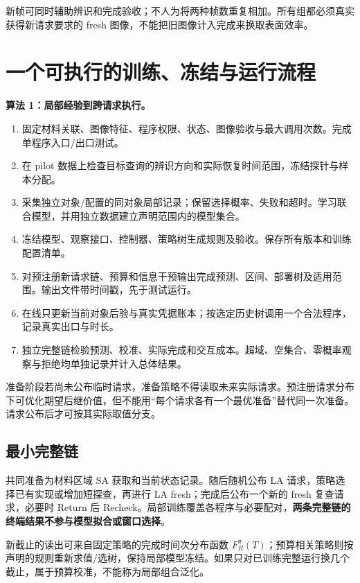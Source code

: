 \documentclass[11pt,a4paper,fontset=fandol]{ctexart}
\theoremstyle{definition}\newtheorem{definition}[theorem]{定义}
\theoremstyle{remark}\newtheorem{remark}[theorem]{说明}
\numberwithin{equation}{section}
\begin{document}
新帧可同时辅助辨识和完成验收；不人为将两种帧数重复相加。所有组都必须真实获得新请求要求的 fresh 图像，不能把旧图像计入完成来换取表面效率。

\clearpage
\section{一个可执行的训练、冻结与运行流程}
\label{sec:workflow}
\begin{corebox}
\textbf{算法 1：局部经验到跨请求执行。}
\begin{enumerate}
\item 固定材料关联、图像特征、程序权限、状态、图像验收与最大调用次数。完成单程序入口/出口测试。
\item 在 pilot 数据上检查目标查询的辨识方向和实际恢复时间范围，冻结探针与样本分配。
\item 采集独立对象/配置的同对象局部记录；保留选择概率、失败和超时。学习联合模型，并用独立数据建立声明范围内的模型集合。
\item 冻结模型、观察接口、控制器、策略树生成规则及验收。保存所有版本和训练配置清单。
\item 对预注册新请求链、预算和信息干预输出完成预测、区间、部署树及适用范围。输出文件带时间戳，先于测试运行。
\item 在线只更新当前对象后验与真实凭据账本；按选定历史树调用一个合法程序，记录真实出口与时长。
\item 独立完整链检验预测、校准、实际完成和交互成本。超域、空集合、零概率观察与拒绝均单独记录并计入总体结果。
\end{enumerate}
\end{corebox}

准备阶段若尚未公布临时请求，准备策略不得读取未来实际请求。预注册请求分布下可优化期望后继价值，但不能用“每个请求各有一个最优准备”替代同一次准备。请求公布后才可按其实际取值分支。

\subsection{最小完整链}
共同准备为材料区域 SA 获取和当前状态记录。随后随机公布 LA 请求，策略选择已有实现或增加短探查，再进行 LA fresh；完成后公布一个新的 fresh 复查请求，必要时 Return 后 Recheck。局部训练覆盖各程序与必要配对，\textbf{两条完整链的终端结果不参与模型拟合或窗口选择}。

新截止的读出可来自固定策略的完成时间次分布函数 $F_R^\pi(T)$；预算相关策略则按声明的规则重新求值/选树，保持局部模型冻结。如果只对已训练完整运行换几个截止，属于预算校准，不能称为局部组合泛化。
\end{document}
